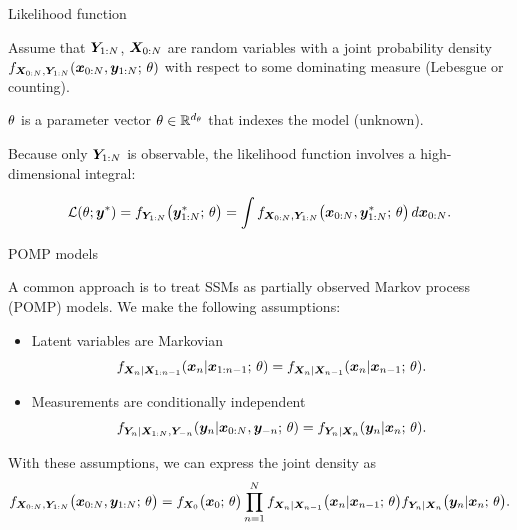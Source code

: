 \documentclass[aspectratio=169]{beamer}\usepackage[]{graphicx}\usepackage[]{xcolor}
\begin{document}
\begin{frame}{Likelihood function}

  Assume that $\bm{Y}_{{1}:{N}}$, $\bm{X}_{{0}:{N}}$ are random variables with a joint probability density $f_{\bm{X}_{{0}:{N}}, \bm{Y}_{{1}:{N}}}(\bm{x}_{{0}:{N}}, \bm{y}_{{1}:{N}}; \, \theta)$ with respect to some dominating measure (Lebesgue or counting).
  
  $\theta$ is a parameter vector $\theta \in \mathbb{R}^{d_\theta}$ that indexes the model (unknown).
  
  Because only $\bm{Y}_{{1}:{N}}$ is observable, the likelihood function involves a high-dimensional integral: 
  
\begin{eqnarray}
  \label{eq:likedef}
  \mathcal{L}(\theta; \bm{y}^*) = f_{\bm{Y}_{1:N}}\big(\bm{y}_{1:N}^*; \, \theta\big) = \int f_{\bm{X}_{{0}:{N}}, \bm{Y}_{{1}:{N}}}\big(\bm{x}_{{0}:{N}}, \bm{y}_{{1}:{N}}^*;\, \theta\big) \, d\bm{x}_{{0}:{N}}.
\end{eqnarray}

\end{frame}

\begin{frame}{POMP models}

A common approach is to treat SSMs as partially observed Markov process (POMP) models. We make the following assumptions: 
\begin{itemize}
  \item Latent variables are Markovian
  $$
  f_{\bm{X}_{n} | \bm{X}_{1:n-1}}(\bm{x}_{n} | \bm{x}_{1:n-1}; \, \theta) = f_{\bm{X}_{n} | \bm{X}_{n-1}}(\bm{x}_{n} | \bm{x}_{n-1}; \, \theta).
  $$
  \item Measurements are conditionally independent
  $$
  f_{\bm{Y}_{n} | \bm{X}_{1:N}, \bm{Y}_{-n}}(\bm{y}_{n} | \bm{x}_{0:N}, \bm{y}_{-n}; \, \theta) = f_{\bm{Y}_{n} | \bm{X}_{n}}(\bm{y}_{n} | \bm{x}_{n}; \, \theta).
  $$
\end{itemize}
With these assumptions, we can express the joint density as
\begin{eqnarray}
\label{eq:jointLik}
f_{\bm{X}_{0:N}, \bm{Y}_{1:N}}\big(\bm{x}_{0:N}, \bm{y}_{1:N};\, \theta\big) = f_{\bm{X}_0}\big(\bm{x}_0;\, \theta\big)\prod_{n = 1}^N f_{\bm{X}_n|\bm{X}_{n-1}}\big(\bm{x}_{n}|\bm{x}_{n-1}; \, \theta\big)f_{\bm{Y}_n|\bm{X}_{n}}\big(\bm{y}_n|\bm{x}_{n}; \, \theta\big).
\end{eqnarray}
\end{frame}
\end{document}
